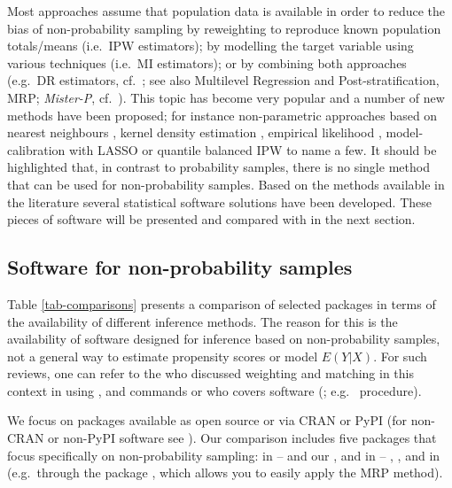 \documentclass[
]{jss}
\begin{document}
Most approaches assume that population data is available in order to
reduce the bias of non-probability sampling by reweighting to reproduce
known population totals/means (i.e.~IPW estimators); by modelling the
target variable using various techniques (i.e.~MI estimators); or by
combining both approaches (e.g.~DR estimators,
cf.~\citet{chen2020doubly}; see also Multilevel Regression and
Post-stratification, MRP; \textit{Mister-P},
cf.~\citet{gelman1997poststratification}). This topic has become very
popular and a number of new methods have been proposed; for instance
non-parametric approaches based on nearest neighbours
\citep{yang2021integration}, kernel density estimation
\citep{chen_nonparametric_2022}, empirical likelihood
\citep{kim2023empirical}, model-calibration with LASSO \citep{chen2018}
or quantile balanced IPW \citep{beresewicz2025} to name a few. It should
be highlighted that, in contrast to probability samples, there is no
single method that can be used for non-probability samples. Based on the
methods available in the literature several statistical software
solutions have been developed. These pieces of software will be
presented and compared with  in the next section.

\subsection{Software for non-probability samples}\label{sec-software}

Table \ref{tab-comparisons} presents a comparison of selected packages
in terms of the availability of different inference methods. The reason
for this is the availability of software designed for inference based on
non-probability samples, not a general way to estimate propensity scores
or model \(E(Y|X)\). For such reviews, one can refer to the
\citet[chapter 6]{valliant2018survey} who discussed weighting and
matching in this context in  \citep{Stata2025} using
,  and  commands or
\citet[eg. chapter 8]{lohr2021sas} who covers  software
(\citet{sas94}; e.g.~ procedure).

We focus on packages available as open source or via CRAN or PyPI (for
non-CRAN or non-PyPI software see \citet{cobo2024software}). Our
comparison includes five packages that focus specifically on
non-probability sampling: in  -- 
\citep{NonProbEst} and our , and in  --
 \citep{sarig2023balancepythonpackage}, 
\citep{castro2024inps}, and in  \citep{carpenter2017stan}
(e.g.~through the  package , which allows you
to easily apply the \citep{rstanarm} MRP method).
\end{document}
